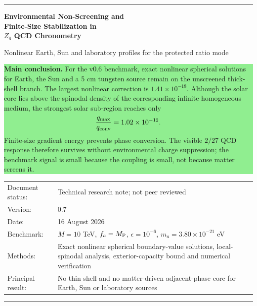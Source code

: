 \documentclass[11pt,a4paper]{article}
\begin{document}

\begin{titlepage}
\thispagestyle{empty}
\vspace*{7mm}

{\color{navy}\rule{\textwidth}{1.2pt}}
\vspace{7mm}

{\fontsize{20}{24}\selectfont\bfseries\color{navy} Environmental Non-Screening and\\ Finite-Size Stabilization in\\ $Z_6$ QCD Chronometry\par}
\vspace{3mm}
{\Large Nonlinear Earth, Sun and laboratory profiles for the protected ratio mode\par}

\vspace{9mm}

\begin{center}
\begin{minipage}{0.93\textwidth}
\colorbox{lightgreen}{\parbox{0.96\textwidth}{
\textbf{Main conclusion.} For the v0.6 benchmark, exact nonlinear spherical solutions for Earth, the Sun and a 5 cm tungsten source remain on the unscreened thick-shell branch. The largest nonlinear correction is $1.41\times10^{-18}$. Although the solar core lies above the spinodal density of the corresponding infinite homogeneous medium, the strongest solar sub-region reaches only
\[
\frac{q_{\max}}{q_{\rm conv}}=1.02\times10^{-12}.
\]
Finite-size gradient energy prevents phase conversion. The visible $2/27$ QCD response therefore survives without environmental charge suppression; the benchmark signal is small because the coupling is small, not because matter screens it.
}}
\end{minipage}
\end{center}

\vfill

\begin{tabularx}{\textwidth}{@{}p{}X@{}}
Document status: & Technical research note; not peer reviewed \\
Version: & 0.7 \\
Date: & 16 August 2026 \\
Benchmark: & $M=10$ TeV, $f_a=M_{\rm P}$, $\epsilon=10^{-6}$, $m_a=3.80\times10^{-21}$ eV \\
Methods: & Exact nonlinear spherical boundary-value solutions, local-spinodal analysis, exterior-capacity bound and numerical verification \\
Principal result: & No thin shell and no matter-driven adjacent-phase core for Earth, Sun or laboratory sources
\end{tabularx}

\vspace{7mm}
{\color{navy}\rule{\textwidth}{1.2pt}}
\end{titlepage}
\end{document}
